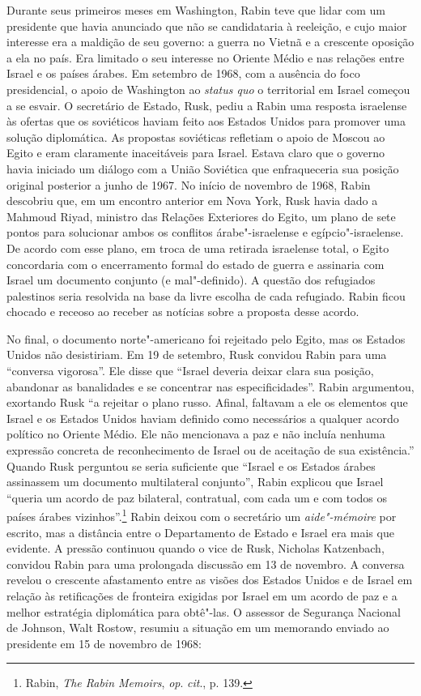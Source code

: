 Durante seus primeiros meses em Washington, Rabin teve que lidar com um
presidente que havia anunciado que não se candidataria à reeleição, e
cujo maior interesse era a maldição de seu governo: a guerra no Vietnã e
a crescente oposição a ela no país. Era limitado o seu interesse no
Oriente Médio e nas relações entre Israel e os países árabes. Em
setembro de 1968, com a ausência do foco presidencial, o apoio de
Washington ao \textit{status quo} o territorial em Israel começou a se
esvair. O secretário de Estado, Rusk, pediu a Rabin uma resposta
israelense às ofertas que os soviéticos haviam feito aos Estados Unidos para
promover uma solução diplomática. As propostas soviéticas refletiam o
apoio de Moscou ao Egito e eram claramente inaceitáveis para Israel.
Estava claro que o governo havia iniciado um diálogo com a União
Soviética que enfraqueceria sua posição original posterior a junho de
1967. No início de novembro de 1968, Rabin descobriu que, em um encontro
anterior em Nova York, Rusk havia dado a Mahmoud Riyad, ministro das
Relações Exteriores do Egito, um plano de sete pontos para solucionar
ambos os conflitos árabe"-israelense e egípcio"-israelense. De acordo com esse
plano, em troca de uma retirada israelense total, o Egito concordaria
com o encerramento formal do estado de guerra e assinaria com Israel um
documento conjunto (e mal"-definido). A questão dos refugiados palestinos
seria resolvida na base da livre escolha de cada refugiado. Rabin ficou
chocado e receoso ao receber as notícias sobre a proposta desse acordo.

No final, o documento norte"-americano foi rejeitado pelo Egito, mas os
Estados Unidos não desistiriam. Em 19 de setembro, Rusk convidou Rabin para uma
``conversa vigorosa''. Ele disse que ``Israel deveria deixar clara sua
posição, abandonar as banalidades e se concentrar nas especificidades''. Rabin
argumentou, exortando Rusk ``a rejeitar o plano russo. Afinal, faltavam
a ele os elementos que Israel e os Estados Unidos haviam definido como necessários
a qualquer acordo político no Oriente Médio. Ele não mencionava a paz e
não incluía nenhuma expressão concreta de reconhecimento de Israel ou de
aceitação de sua existência.'' Quando Rusk perguntou se seria suficiente
que ``Israel e os Estados árabes assinassem um documento multilateral
conjunto'', Rabin explicou que Israel ``queria um acordo de paz
bilateral, contratual, com cada um e com todos os países árabes
vizinhos''.\footnote{Rabin, \textit{The Rabin Memoirs}, \textit{op}. \textit{cit}., p. 139.} 
Rabin deixou com o secretário um
\textit{aide"-mémoire} por escrito, mas a distância entre o Departamento de
Estado e Israel era mais que evidente. A pressão continuou quando o vice
de Rusk, Nicholas Katzenbach, convidou Rabin para uma prolongada
discussão em 13 de novembro. A conversa revelou o crescente afastamento
entre as visões dos Estados Unidos e de Israel em relação às retificações de
fronteira exigidas por Israel em um acordo de paz e a melhor estratégia
diplomática para obtê"-las. O assessor de Segurança Nacional de Johnson,
Walt Rostow, resumiu a situação em um memorando enviado ao presidente em
15 de novembro de 1968: 

